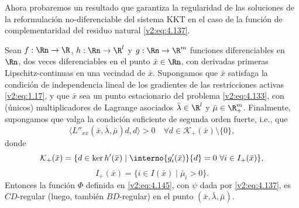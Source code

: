 Ahora probaremos un resultado que garantiza la regularidad de las soluciones de la reformulación no-diferenciable del sistema KKT en el caso de la función de complementaridad del residuo natural \eqref{v2:eq:4.137}.

\begin{proposition}\label{v2:prop:4.5.2}
    Sean $f : \Rn \to \R$, $h : \Rn \to \R^l$ y $g : \Rn \to \R^m$ funciones diferenciables en $\Rn$, dos veces diferenciables en el punto $\bar{x} \in \Rn$, con derivadas primeras Lipschitz-continuas en una vecindad de $\bar{x}$. Supongamos que $\bar{x}$ satisfaga la condición de independencia lineal de los gradientes de las restricciones activas \eqref{v2:eq:1.17}, y que $\bar{x}$ sea un punto estacionario del problema \eqref{v2:eq:4.133}, con (únicos) multiplicadores de Lagrange asociados $\bar{\lambda} \in \R^l$ y $\bar{\mu} \in \R^m_+$. Finalmente, supongamos que valga la condición suficiente de segunda orden fuerte, i.e., que
    \begin{equation}
        \langle L''_{xx}(\bar{x}, \bar{\lambda}, \bar{\mu})d, d \rangle > 0 \quad \forall d \in \mathcal{K}_+(\bar{x}) \setminus \{0\},
        \label{v2:eq:4.146}
    \end{equation}
    donde
    \[
        \mathcal{K}_+(\bar{x}) = \{ d \in \ker h'(\bar{x}) \mid \interno{g'_i(\bar{x})}{d} = 0 \ \forall i \in I_+(\bar{x}) \},
    \]
    \[
        I_+(\bar{x}) = \{ i \in I(\bar{x}) \mid \bar{\mu}_i > 0 \}.
    \]
    Entonces la función $\Phi$ definida en \eqref{v2:eq:4.145}, con $\psi$ dada por \eqref{v2:eq:4.137}, es $CD$-regular (luego, también $BD$-regular) en el punto $(\bar{x}, \bar{\lambda}, \bar{\mu})$.
\end{proposition}

